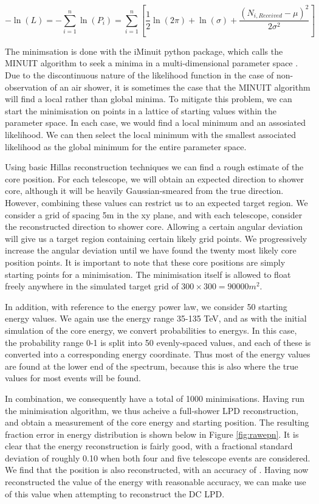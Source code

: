 \documentclass{article}
\begin{document}
\[ - \ln(L) = - \sum_{i=1}^{n} \ln(P_{i}) =  \sum_{i=1}^{n} [ \frac{1}{2}\ln(2 \pi) + \ln(\sigma) + \frac{(N_{i, Received} - \mu)^{2}}{2 \sigma^{2}}]\]

The minimsation is done with the iMinuit python package, which calls the MINUIT algorithm to seek a minima in a multi-dimensional parameter space \cite{James75}. Due to the discontinuous nature of the likelihood function in the case of non-observation of an air shower, it is sometimes the case that the MINUIT algorithm will find a local rather than global minima. To mitigate this problem, we can start the minimisation on points in a lattice of starting values within the parameter space. In each case, we would find a local minimum and an assosiated likelihood. We can then select the local minimum with the smallest associated likelihood as the global minimum for the entire parameter space. 

Using basic Hillas reconstruction techniques we can find a rough estimate of the core position. For each telescope, we will obtain an expected direction to shower core, although it will be heavily Gaussian-smeared from the true direction. However, combining these values can restrict us to an expected target region. We consider a grid of spacing 5m in the xy plane, and with each telescope, consider the reconstructed direction to shower core. Allowing a certain angular deviation will give us a target region containing certain likely grid points. We progressively increase the angular deviation until we have found the twenty most likely core position points. It is important to note that these core positions are simply starting points for a minimisation. The minimisation itself is allowed to float freely anywhere in the simulated target grid of $300 \times 300 = 90000 m^{2}$.

In addition, with reference to the energy power law, we consider 50 starting energy values. We again use the energy range 35-135 TeV, and as with the initial simulation of the core energy, we convert probabilities to energys. In this case, the probability range 0-1 is split into 50 evenly-spaced values, and each of these is converted into a corresponding energy coordinate. Thus most of the energy values are found at the lower end of the spectrum, because this is also where the true values for most events will be found.

In combination, we consequently have a total of 1000 minimisations. Having run the minimisation algorithm, we thus acheive a full-shower LPD reconstruction, and obtain a measurement of the core energy and starting position. The resulting fraction error in energy distribution is shown below in Figure \ref{fig:rawepn}. It is clear that the energy reconstruction is fairly good, with a fractional standard deviation of roughly 0.10 when both four and five telescope events are considered. We find that the position is also reconstructed, with an accuracy of . Having now reconstructed the value of the energy with reasonable accuracy, we can make use of this value when attempting to reconstruct the DC LPD. 
\end{document}
